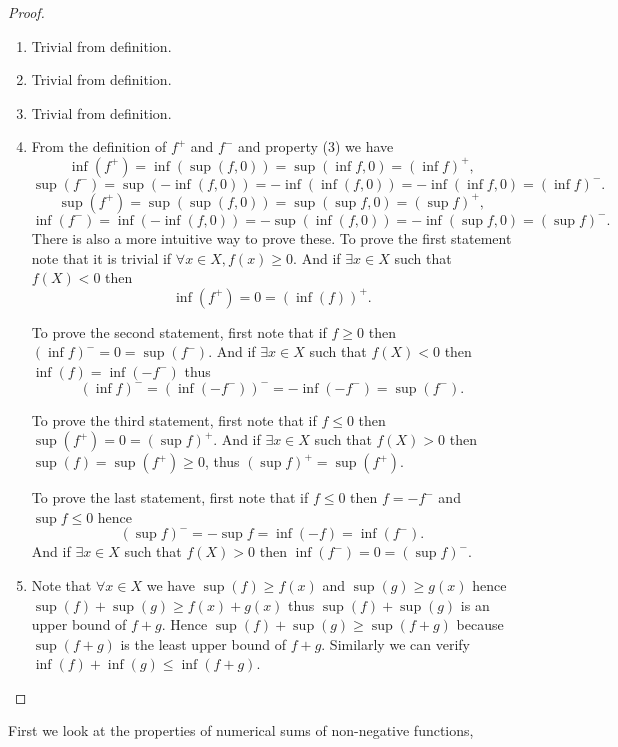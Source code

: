 \begin{proof}
\begin{enumerate}
  \item Trivial from definition.
  \item Trivial from definition.
  \item Trivial from definition.
  \item From the definition of $f^+$ and $f^-$ and property (3) we have
    \[
      \inf(f^+)=\inf(\sup(f,0))=\sup(\inf f,0)=(\inf f)^+,
    \]
    \[
      \sup(f^-)=\sup(-\inf(f,0))=-\inf(\inf(f,0))=-\inf(\inf f,0)=(\inf f)^-.
    \]
    \[
      \sup(f^+)=\sup(\sup(f,0))=\sup(\sup f,0)=(\sup f)^+,
    \]
    \[
      \inf(f^-)=\inf(-\inf(f,0))=-\sup(\inf(f,0))=-\inf(\sup f,0)=(\sup f)^-.
    \]
    There is also a more intuitive way to prove these. To prove the first
    statement note that it is trivial if $\forall x\in X, f(x)\ge 0$. 
    And if $\exists x\in X$ such that $f(X)<0$ then
    \[
      \inf(f^+)=0=(\inf(f))^+.
    \]

    To prove the second statement, first note that if $f\ge 0$ then 
    $(\inf f)^-=0=\sup(f^-)$. And if $\exists x\in X$ such that $f(X)<0$ then
    $\inf(f)=\inf(-f^-)$ thus
    \[
      (\inf f)^-=(\inf(-f^-))^-=-\inf(-f^-)=\sup(f^-).
    \]

    To prove the third statement, first note that if $f\le 0$ then 
    $\sup(f^+)=0=(\sup f)^+$. And if $\exists x\in X$ such that $f(X)>0$ then
    $\sup(f)=\sup(f^+)\ge 0$, thus $(\sup f)^+=\sup(f^+)$. 

    To prove the last statement, first note that if $f\le 0$ then $f=-f^-$ and
    $\sup f\le 0$ hence
    \[
      (\sup f)^- = -\sup f = \inf (-f) = \inf(f^-).
    \]
    And if $\exists x\in X$ such that $f(X)>0$ then $\inf(f^-)=0=(\sup f)^-$.
  \item Note that $\forall x\in X$ we have $\sup(f)\ge f(x)$ and 
    $\sup(g)\ge g(x)$ hence $\sup(f)+\sup(g)\ge f(x)+g(x)$ thus
    $\sup(f)+\sup(g)$ is an upper bound of $f+g$. Hence
    $\sup(f)+\sup(g)\ge\sup(f+g)$ because $\sup(f+g)$ is the least upper bound
    of $f+g$. Similarly we can verify $\inf(f)+\inf(g)\le\inf(f+g)$.
\end{enumerate}
\end{proof}





First we look at the properties of numerical sums of non-negative functions,


